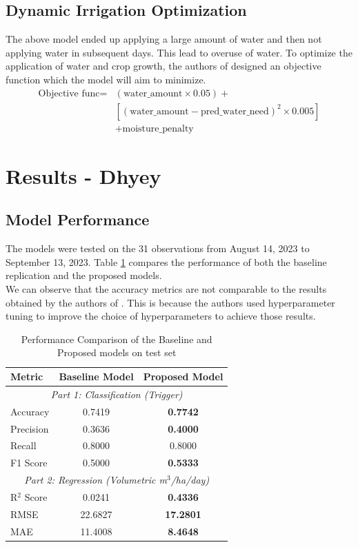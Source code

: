 \documentclass[conference]{IEEEtran}
\begin{document}
\subsection{Dynamic Irrigation Optimization}
The above model ended up applying a large amount of water and then not applying water in subsequent days. This lead to overuse of water. To optimize the application of water and crop growth, the authors of \cite{base} designed an objective function which the model will aim to minimize.
\begin{equation}
\begin{split}
\text{Objective func} = & (\text{water\_amount} \times 0.05) + \\
& [(\text{water\_amount} - \text{pred\_water\_need})^2 \times 0.005] \\
& + \text{moisture\_penalty}
\end{split}
\end{equation}

\section{Results - Dhyey}
\subsection{Model Performance}
The models were tested on the 31 observations from August 14, 2023 to September 13, 2023. Table \ref{tab_performance}
compares the performance of both the baseline replication \cite{base} and the proposed models. \\
We can observe that the accuracy metrics are not comparable to the results obtained by the authors of \cite{base}. This is because the authors used hyperparameter tuning to improve the choice of hyperparameters to achieve those results.

\begin{table}[htbp]
\caption{Performance Comparison of the Baseline and Proposed models on test set}
\begin{center}
\begin{tabular}{|l|c|c|}
\hline
\textbf{Metric} & \textbf{Baseline Model} & \textbf{Proposed Model} \\
\hline
\multicolumn{3}{|c|}{\textit{Part 1: Classification (Trigger)}} \\
\hline
Accuracy & 0.7419 & \textbf{0.7742} \\
Precision & 0.3636 & \textbf{0.4000} \\
Recall & 0.8000 & 0.8000 \\
F1 Score & 0.5000 & \textbf{0.5333} \\
\hline
\multicolumn{3}{|c|}{\textit{Part 2: Regression (Volumetric m$^3$/ha/day)}} \\
\hline
R$^2$ Score & 0.0241 & \textbf{0.4336} \\
RMSE & 22.6827 & \textbf{17.2801} \\
MAE & 11.4008 & \textbf{8.4648} \\
\hline
\end{tabular}
\label{tab_performance}
\end{center}
\end{table}
\end{document}
